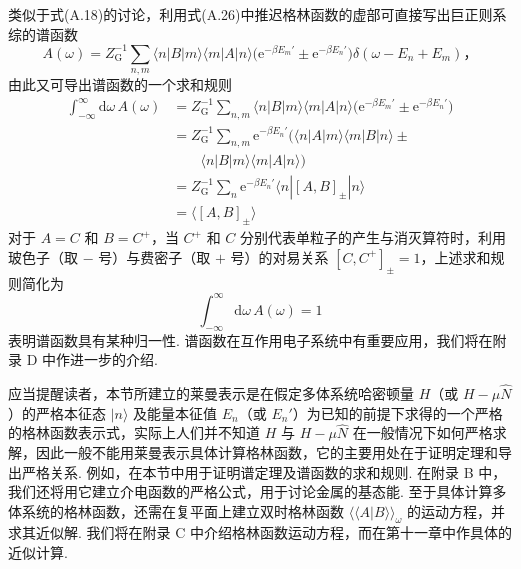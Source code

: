 类似于式(A.18)的讨论，利用式(A.26)中推迟格林函数的虚部可直接写出巨正则系综的谱函数
\begin{equation}
A(\omega)=Z_{\mathrm{G}}^{-1}\sum_{n,m}\langle n|B|m\rangle
\langle m|A|n\rangle\bigl(\mathrm{e}^{-\beta E_{m}'}
\pm\mathrm{e}^{-\beta E_{n}'}\bigr)
\delta(\omega-E_{n}+E_{m})\text{，}
\end{equation}
由此又可导出谱函数的一个求和规则
\begin{equation}
\begin{aligned}
\int_{-\infty}^{\infty}\mathrm{d}\omega\,A(\omega)
&=Z_{\mathrm{G}}^{-1}\sum_{n,m}\langle n|B|m\rangle
\langle m|A|n\rangle\bigl(\mathrm{e}^{-\beta E_{m}'}
\pm\mathrm{e}^{-\beta E_{n}'}\bigr)\\
&=Z_{\mathrm{G}}^{-1}\sum_{n,m}\mathrm{e}^{-\beta E_{n}'}
\bigl(\langle n|A|m\rangle\langle m|B|n\rangle\pm\\
&\qquad\langle n|B|m\rangle\langle m|A|n\rangle\bigr)\\
&=Z_{\mathrm{G}}^{-1}\sum_{n}\mathrm{e}^{-\beta E_{n}'}
\langle n|[A,B]_{\pm}|n\rangle\\
&=\langle[A,B]_{\pm}\rangle
\end{aligned}
\end{equation}
对于 $A=C$ 和 $B=C^{+}$，当 $C^{+}$ 和 $C$ 分别代表单粒子的产生与消灭算符时，利用玻色子（取 $-$ 号）与费密子（取 $+$ 号）的对易关系 $[C,C^{+}]_{\pm}=1$，上述求和规则简化为
\begin{equation}
\int_{-\infty}^{\infty}\mathrm{d}\omega\,A(\omega)=1
\end{equation}
表明谱函数具有某种归一性. 谱函数在互作用电子系统中有重要应用，我们将在附录 D 中作进一步的介绍.

应当提醒读者，本节所建立的莱曼表示是在假定多体系统哈密顿量 $H$（或 $H-\mu\hat{N}$）的严格本征态 $|n\rangle$ 及能量本征值 $E_{n}$（或 $E_{n}'$）为已知的前提下求得的一个严格的格林函数表示式，实际上人们并不知道 $H$ 与 $H-\mu\hat{N}$ 在一般情况下如何严格求解，因此一般不能用莱曼表示具体计算格林函数，它的主要用处在于证明定理和导出严格关系. 例如，在本节中用于证明谱定理及谱函数的求和规则. 在附录 B 中，我们还将用它建立介电函数的严格公式，用于讨论金属的基态能. 至于具体计算多体系统的格林函数，还需在复平面上建立双时格林函数 $\langle\langle A|B\rangle\rangle_{\omega}$ 的运动方程，并求其近似解. 我们将在附录 C 中介绍格林函数运动方程，而在第十一章中作具体的近似计算.
